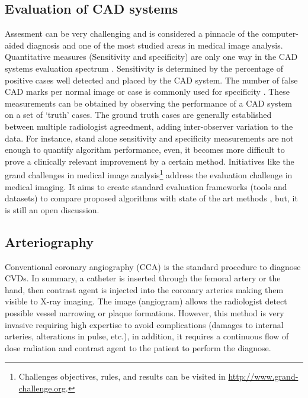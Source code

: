 \subsection{Evaluation of CAD systems}

Assesment can be very challenging and is considered a pinnacle of the computer-aided diagnosis and one of the most studied areas in medical image analysis. Quantitative measures (Sensitivity and specificity) are only one way in the CAD systems evaluation spectrum \citep{Ginneken2011}. Sensitivity is determined by the percentage of positive cases well detected and placed by the CAD system. The number of false CAD marks per normal image or case is commonly used for specificity \citep{Castellino2005}. These measurements can be obtained by observing the performance of a CAD system on a set of ‘truth’ cases. The ground truth cases are generally established between multiple radiologist agreedment, adding inter-observer variation to the data. For instance, stand alone sensitivity and specificity measurements are not enough to quantify algorithm performance, even, it becomes more difficult to prove a clinically relevant improvement by a certain method. 
Initiatives like the grand challenges in medical image analysis\footnote{Challenges objectives, rules, and results can be visited in \href{http://www.grand-challenge.org}{http://www.grand-challenge.org}.} address the evaluation challenge in medical imaging. It aims to create standard evaluation frameworks (tools and datasets) to compare proposed algorithms with state of the art methods \citep{Hameeteman2011, Schaap2009, Kirisli2013} , but, it is still an open discussion.

\subsection{Arteriography}

Conventional coronary angiography (CCA) is the standard procedure to diagnose CVDs. In summary, a catheter is inserted through the femoral artery or the hand, then contrast agent is injected into the coronary arteries making them visible to X-ray imaging. The image (angiogram) allows the radiologist detect possible vessel narrowing or plaque formations. However, this method is very invasive requiring high expertise to avoid complications (damages to internal arteries, alterations in pulse, etc.), in addition, it requires a continuous flow of dose radiation and contrast agent to the patient to perform the diagnose.

